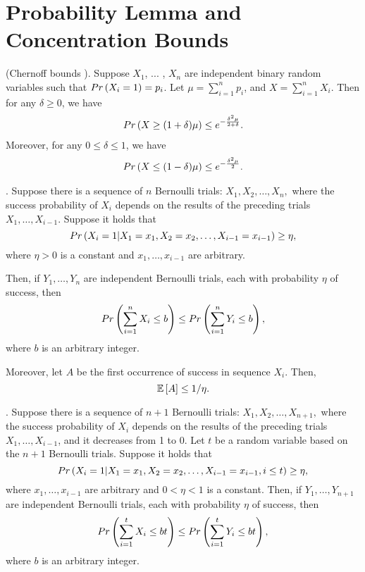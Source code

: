 \section{Probability Lemma and Concentration Bounds} \label{apx:prob}
\begin{lemma}\label{lemma:chernoff}
    (Chernoff bounds \cite{mitzenmacher2017probability}). 
    Suppose $X_1$, ... , $X_n$ are independent binary random variables such that 
    $Pr \left( X_i = 1 \right) = p_i$. Let $\mu = \sum_{i=1}^n p_i$, and 
    $X = \sum_{i=1}^n X_i$. Then for any $\delta \geq 0$, we have
    \begin{align}
        Pr \left( X \ge (1+\delta)\mu \right) \le e^{-\frac{\delta^2 \mu}{2+\delta}}.
    \end{align}
    Moreover, for any $0 \leq \delta \leq 1$, we have
    \begin{align}
        Pr \left( X \le (1-\delta)\mu \right) \le e^{-\frac{\delta^2 \mu}{2}}.
    \end{align}
\end{lemma}
\begin{lemma} \label{lemma:indep}
    \cite{chen2021best}.
    Suppose there is a sequence of $n$ Bernoulli trials:
    $X_1, X_2, \ldots, X_n,$
    where the success probability of $X_i$
    depends on the results of
    the preceding trials $X_1, \ldots, X_{i-1}$.
    Suppose it holds that $$Pr \left( X_i = 1 | X_1 = x_1, X_2 = x_2, \ldots, X_{i-1} = x_{i-1}  \right) \ge \eta,$$ where $\eta > 0$ is a constant and $x_1,\ldots,x_{i-1}$ are arbitrary.
  
    Then, if $Y_1,\ldots, Y_n$ are independent Bernoulli trials, each with probability $\eta$ of
    success, then $$Pr \left( \sum_{i = 1}^n X_i \le b  \right) \le Pr \left( \sum_{i = 1}^n Y_i \le b  \right), $$
    where $b$ is an arbitrary integer.
  
    Moreover, let $A$ be the first occurrence of success in sequence $X_i$.
    Then, $$\mathbb{E} \left[ A \right] \le 1/\eta.$$
\end{lemma}
\begin{lemma} \label{lemma:indep2}
    \cite{chen2021best}.
    Suppose there is a sequence of $n+1$ Bernoulli trials:
    $X_1, X_2, \ldots,X_{n+1},$
    where the success probability of $X_i$
    depends on the results of
    the preceding trials $X_1, \ldots, X_{i-1}$,
    and it decreases from 1 to 0.
    Let $t$ be a random variable based on the $n+1$ Bernoulli trials.
    Suppose it holds that 
    $$Pr \left( X_i = 1 | X_1 = x_1, X_2 = x_2, \ldots, X_{i-1} = x_{i-1}, i\le t  \right) \ge \eta,$$ 
    where $x_1,\ldots,x_{i-1}$ are arbitrary and $0 < \eta < 1$ is a constant.
    Then, if $Y_1,\ldots, Y_{n+1}$ are independent Bernoulli trials, each with probability $\eta$ of
    success, then 
    $$Pr \left( \sum_{i = 1}^t X_i \le bt  \right) \le Pr \left( \sum_{i = 1}^t Y_i \le bt  \right), $$
    where $b$ is an arbitrary integer.
\end{lemma}
